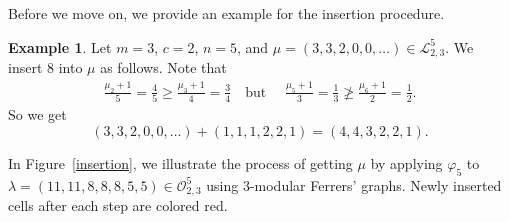 \documentclass[11pt,reqno]{amsart}
\numberwithin{equation}{section}
\theoremstyle{plain}
\theoremstyle{definition}
\newtheorem{example}[theorem]{Example}
\newcommand{\OO}{\mathcal{O}}
\newcommand{\LL}{\mathcal{L}}
\begin{document}
Before we move on, we provide an example for the insertion procedure.
\begin{example}
Let $m=3$, $c=2$,  $n=5$, and $\mu=(3,3,2,0,0,\ldots) \in \LL_{2,3}^5$. We insert $8$ into $\mu$ as follows. Note that
\begin{align*}
\frac{\mu_2+1}{5}=\frac{4}{5}\ge \frac{\mu_{3}+1}{4}=\frac{3}{4} \quad \text{but } \quad \frac{\mu_5+1}{3}=\frac{1}{3} \not\ge \frac{\mu_{6}+1}{2}=\frac{1}{2}.
\end{align*}
So we get
\begin{equation*}
(3,3,2,0,0,\ldots)+ (1,1,1,2,2,1)=(4,4,3,2,2,1).
\end{equation*}

\end{example}

In Figure~\ref{insertion}, we illustrate the process of getting $\mu$ by applying $\varphi_5$ to $\lambda=(11, 11, 8, 8, 8, 5, 5) \in \OO_{2,3}^{5}$ using $3$-modular Ferrers' graphs. Newly inserted cells after each step are colored red.
\end{document}
